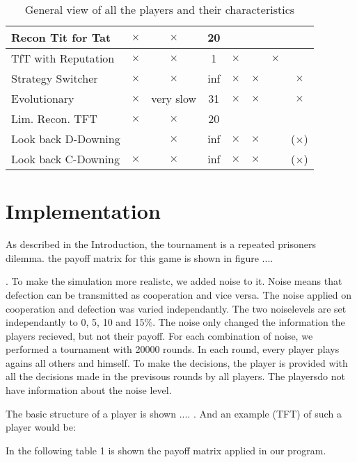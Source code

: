 \documentclass[11pt,twoside]{article}
\renewcommand\headrulewidth{0.4pt}
\begin{document}
\begin{sidewaystable}
\begin{tabular}[]{|l|c|c|c|c|c|c|c|}
 \hline
Recon Tit for Tat	& $\times$	&$\times$	&20		&		&		&		&		\\
 \hline
TfT with Reputation& $\times$	&$\times$	&1		&$\times$	&		&$\times$	&		\\
 \hline
Strategy Switcher	& $\times$	&$\times$	&inf		&$\times$	&$\times$	&		&$\times$	\\
 \hline
Evolutionary		& $\times$	&very slow	&31		&$\times$	&$\times$	&		&$\times$	\\
 \hline
Lim. Recon. TFT	& $\times$	&$\times$	&20		&		&		&		&		\\
 \hline
Look back D-Downing& 		&$\times$	&inf		&$\times$	&$\times$	&		&($\times$)	\\
 \hline
Look back C-Downing& $\times$	&$\times$	&inf		&$\times$	&$\times$	&		&($\times$)	\\
 \hline
\end{tabular}
\caption{General view of all the players and their characteristics}
\label{overview}
\end{sidewaystable}

\fancyhead[LE,RO]{ \rightmark}
\fancyhead[LO,RE]{ \leftmark}
 \renewcommand\headrulewidth{0.4pt}
\clearpage
\section{Implementation}

As described in the Introduction, the tournament is a repeated prisoners dilemma. the payoff matrix for this game is shown in figure ....

. To make the simulation more realistc, we added noise to it. Noise means that defection can be transmitted as cooperation and vice versa. The noise applied on cooperation and defection was varied independantly. The two noiselevels are set independantly to 0, 5, 10 and 15\%. The noise only changed the information the players recieved, but not their payoff. For each combination of noise, we performed a tournament with 20000 rounds. In each round, every player plays agains all others and himself. To make the decisions, the player is provided with all the decisions made in the previsous rounds by all players. The playersdo not have information about the noise level. 

The basic structure of a player is shown .... . And an example (TFT) of such a player would be:


In the following table 1 is shown the payoff matrix applied in our program.
\end{document}
